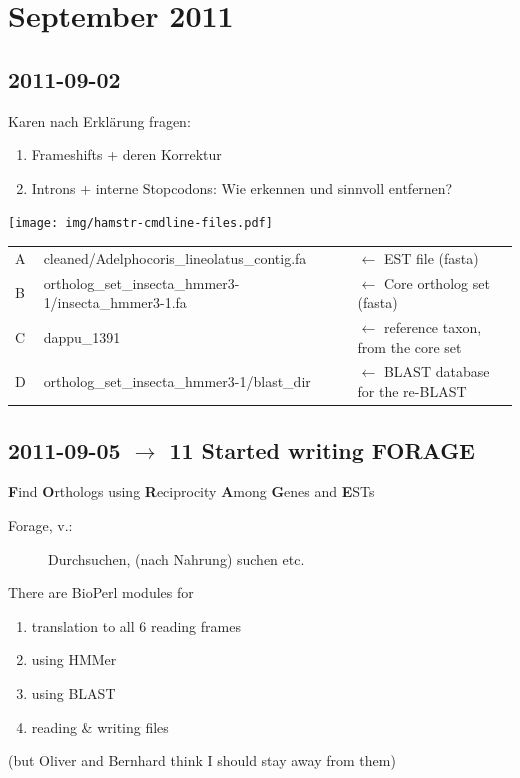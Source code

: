 \section{September 2011}
\subsection*{2011-09-02}

Karen nach Erklärung fragen:
\renewcommand{\labelenumi}{\alph{enumi})}
\begin{enumerate}
	\item Frameshifts + deren Korrektur
	\item Introns + interne Stopcodons: Wie erkennen und sinnvoll entfernen?
\end{enumerate}

\texttt{[image: img/hamstr-cmdline-files.pdf]}
\begin{table}[h]
\begin{tabular}{l l l}
	\textcircled{A} & cleaned/Adelphocoris\_lineolatus\_contig.fa & $\leftarrow$ EST file (fasta)\\
	\textcircled{B} & ortholog\_set\_insecta\_hmmer3-1/insecta\_hmmer3-1.fa & $\leftarrow$ Core ortholog set (fasta)\\
	\textcircled{C} & dappu\_1391 & $\leftarrow$ reference taxon, from the core set \\
	 \textcircled{D} & ortholog\_set\_insecta\_hmmer3-1/blast\_dir & $\leftarrow$ BLAST database for the re-BLAST
\end{tabular}
\end{table}

\subsection*{2011-09-05 $\rightarrow$ 11 Started writing FORAGE}

\textbf{F}ind \textbf{O}rthologs using \textbf{R}eciprocity \textbf{A}mong
\textbf{G}enes and \textbf{E}STs 

\begin{description}
\item[Forage, v.:] Durchsuchen, (nach Nahrung) suchen etc.
\end{description}

There are BioPerl modules for 
\begin{enumerate}
	\item translation to all 6 reading frames
	\item using HMMer
	\item using BLAST
	\item reading \& writing files
\end{enumerate}
(but Oliver and Bernhard think I should stay away from them)

